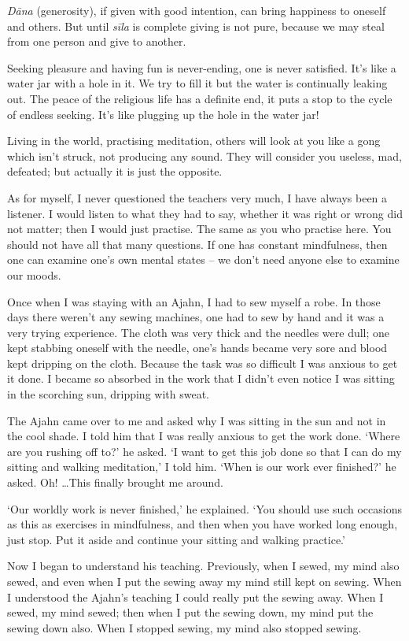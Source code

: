 \emph{Dāna} (generosity), if given with good intention, can bring
happiness to oneself and others. But until \emph{sīla} is complete
giving is not pure, because we may steal from one person and give to
another. 

Seeking pleasure and having fun is never-ending, one is never satisfied. 
It's like a water jar with a hole in it. We try to fill it but the water
is continually leaking out. The peace of the religious life has a
definite end, it puts a stop to the cycle of endless seeking. It's like
plugging up the hole in the water jar! 

Living in the world, practising meditation, others will look at you like
a gong which isn't struck, not producing any sound. They will consider
you useless, mad, defeated; but actually it is just the opposite. 

As for myself, I never questioned the teachers very much, I have always
been a listener. I would listen to what they had to say, whether it was
right or wrong did not matter; then I would just practise. The same as
you who practise here. You should not have all that many questions. If
one has constant mindfulness, then one can examine one's own mental
states -- we don't need anyone else to examine our moods. 

Once when I was staying with an Ajahn, I had to sew myself a robe. In
those days there weren't any sewing machines, one had to sew by hand and
it was a very trying experience. The cloth was very thick and the
needles were dull; one kept stabbing oneself with the needle, one's
hands became very sore and blood kept dripping on the cloth. Because the
task was so difficult I was anxious to get it done. I became so absorbed
in the work that I didn't even notice I was sitting in the scorching
sun, dripping with sweat. 

The Ajahn came over to me and asked why I was sitting in the sun and not
in the cool shade. I told him that I was really anxious to get the work
done. `Where are you rushing off to?' he asked. `I want to get this job
done so that I can do my sitting and walking meditation,' I told him. 
`When is our work ever finished?' he asked. Oh! \ldots{}This finally
brought me around. 

`Our worldly work is never finished,' he explained. `You should use such
occasions as this as exercises in mindfulness, and then when you have
worked long enough, just stop. Put it aside and continue your sitting
and walking practice.'

Now I began to understand his teaching. Previously, when I sewed, my
mind also sewed, and even when I put the sewing away my mind still kept
on sewing. When I understood the Ajahn's teaching I could really put the
sewing away. When I sewed, my mind sewed; then when I put the sewing
down, my mind put the sewing down also. When I stopped sewing, my mind
also stopped sewing. 

